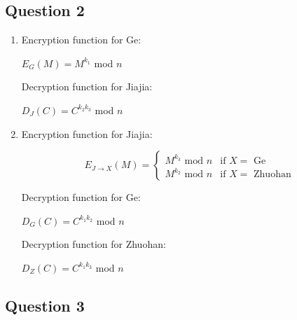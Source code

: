 \documentclass[12pt]{article}
\begin{document}
\subsection*{Question 2}
\begin{enumerate}

\item Encryption function for Ge:
\begin{center}
$E_{G}(M) = M^{k_{1}}$ mod $n$
\end{center}

Decryption function for Jiajia:
\begin{center}
$D_{J}(C) = C^{k_{2} k_{3}}$ mod $n$
\end{center}

\item Encryption function for Jiajia: 
\begin{center}
\[
  E_{J \rightarrow X}(M)=
  \begin{cases}
  	M^{k_{3}} \text{ mod } n & \text{if $X=$ Ge} \\
  	M^{k_{2}} \text{ mod } n & \text{if $X=$ Zhuohan}
  \end{cases}
\]
\end{center}

Decryption function for Ge:
\begin{center}
$D_{G}(C) = C^{k_{1} k_{2}}$ mod $n$
\end{center}

Decryption function for Zhuohan:
\begin{center}
$D_{Z}(C) = C^{k_{1} k_{3}}$ mod $n$
\end{center}


\end{enumerate}

\subsection*{Question 3}
\end{document}
